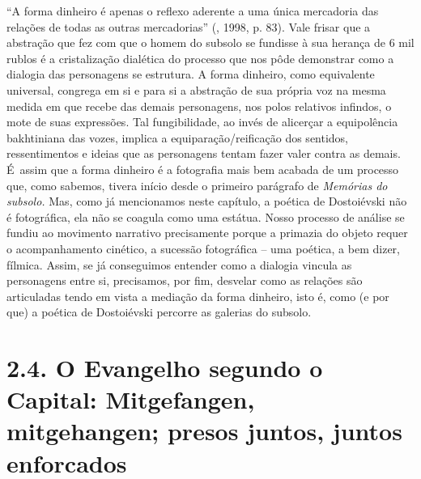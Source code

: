 {``A forma dinheiro é apenas o reflexo aderente a uma única mercadoria
das relações de todas as outras mercadorias'' (, 1998, p. 83). Vale
frisar que a abstração que fez com que o homem do subsolo se fundisse à
sua herança de 6 mil rublos é a cristalização dialética do processo que
nos pôde demonstrar como a dialogia das personagens se estrutura. A
forma dinheiro, como equivalente universal, congrega em si e para si a
abstração de sua própria voz na mesma medida em que recebe das demais
personagens, nos polos relativos infindos, o mote de suas expressões.
Tal fungibilidade, ao invés de alicerçar a equipolência bakhtiniana das
vozes, implica a equiparação/reificação dos sentidos, ressentimentos e
ideias que as personagens tentam fazer valer contra as demais. É~assim
que a forma dinheiro é a fotografia mais bem acabada de um processo que,
como sabemos, tivera início desde o primeiro parágrafo de \emph{Memórias
do subsolo.} Mas, como já mencionamos neste capítulo, a poética de
Dostoiévski não é fotográfica, ela não se coagula como uma estátua.
Nosso processo de análise se fundiu ao movimento narrativo precisamente
porque a primazia do objeto requer o acompanhamento cinético, a sucessão
fotográfica -- uma poética, a bem dizer, fílmica. Assim, se já
conseguimos entender como a dialogia vincula as personagens entre si,
precisamos, por fim, desvelar como as relações são articuladas tendo em
vista a mediação da forma dinheiro, isto é, como (e por que) a poética
de Dostoiévski percorre as galerias do subsolo.

\section{2.4. O Evangelho segundo o Capital: Mitgefangen, mitgehangen; presos juntos, juntos enforcados}

}
